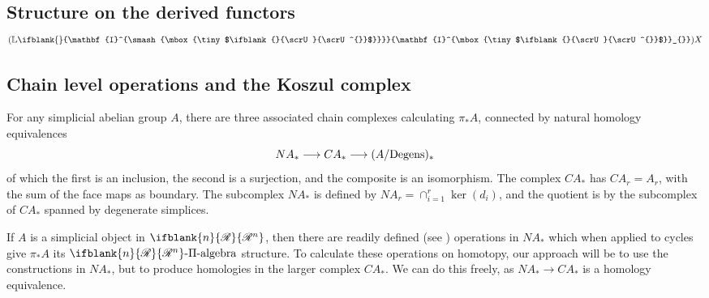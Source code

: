 \documentclass[10pt]{article}
\newcommand{\PRLie}[1]%
{\ifblank{#1}{\scrR}{\scrR^{#1}}}
\newcommand{\nontop}[1]{\ifblank{#1}{\scrU}{\scrU^{#1}}}
\newcommand{\PiAlgebra}[1]{#1\textup{-$\Pi$-algebra}}
\newcommand{\Ind}[2][]{\ifblank{#1}{\mathbf{I}^{\smash{\mbox{\tiny $#2$}}}}{\mathbf{I}^{\mbox{\tiny $#2$}}_{#1}}}%
\newcommand{\BarConst}[1]{B^{\smash{\mbox{\tiny $#1$}}}}
\newcommand{\derived}{\mathbb{L}}
\newcommand{\ModDegeneracies}[1]{(#1/\textup{Degens})}
\begin{document}
\begin{LieLambdaStructureOnKoszul}
\pagebreak
\section{Structure on the derived functors $(\derived\Ind{\nontop{}})X$} 
\subsection{Chain level operations and the Koszul complex} \label{SectionHtpyOpnsOnLieAlgs}
For any simplicial abelian group $A$, %
there are three associated chain complexes calculating $\pi_*A$, connected by natural homology equivalences
\[NA_*\to CA_*\to \ModDegeneracies{A}_*\]
of which the first is an inclusion, the second is a surjection, and the composite is an isomorphism. The complex $CA_*$ has $CA_r=A_r$, with the sum of the face maps as boundary. The subcomplex $NA_*$ is defined by $NA_r=\cap_{i=1}^r\ker(d_i)$, and the quotient is by the subcomplex of $CA_*$ spanned by degenerate simplices.

If $A$ is a simplicial object in $\PRLie{n}$, then there are readily defined (see \cite[\S8]{CurtisSimplicialHtpy.pdf}) operations in $NA_*$ which when applied to cycles give $\pi_*A$ its $\PiAlgebra{\PRLie{n}}$ structure. %
To calculate these operations on homotopy, our approach will be to use the constructions in $NA_*$, but to produce homologies in the larger complex $CA_*$. We can do this freely, as $NA_*\to CA_*$ is a homology equivalence.


\end{LieLambdaStructureOnKoszul}
\end{document}
